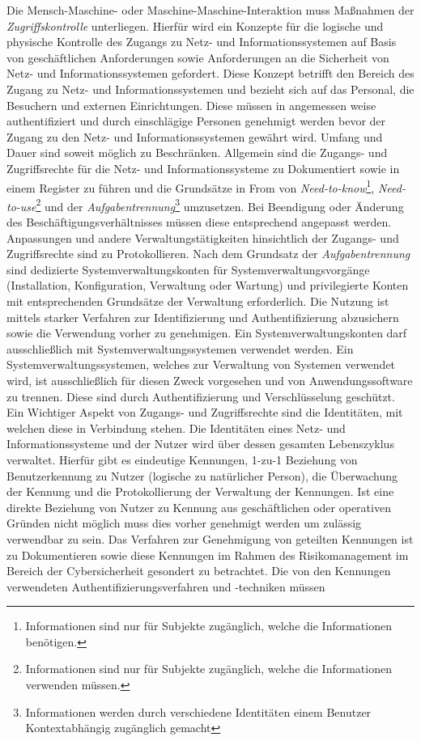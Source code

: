 \documentclass[11pt,a4paper,hidelinks]{article}   %
\begin{document}
                Die Mensch-Maschine- oder Maschine-Maschine-Interaktion muss Maßnahmen der \emph{Zugriffskontrolle} unterliegen. Hierfür wird ein Konzepte für die logische und physische Kontrolle des Zugangs zu Netz- und Informationssystemen auf Basis von geschäftlichen Anforderungen sowie Anforderungen an die Sicherheit von Netz- und Informationssystemen gefordert. Diese Konzept betrifft den Bereich des Zugang zu Netz- und Informationssystemen und bezieht sich auf das Personal, die Besuchern und externen Einrichtungen. Diese müssen in angemessen weise authentifiziert und durch einschlägige Personen genehmigt werden bevor der Zugang zu den Netz- und Informationssystemen gewährt wird. Umfang und Dauer sind soweit möglich zu Beschränken. Allgemein sind die Zugangs- und Zugriffsrechte für die Netz- und Informationssysteme zu Dokumentiert sowie in einem Register zu führen und die Grundsätze in From von \emph{Need-to-know}\footnote{Informationen sind nur für Subjekte zugänglich, welche die Informationen benötigen.}, \emph{Need-to-use}\footnote{Informationen sind nur für Subjekte zugänglich, welche die Informationen verwenden müssen.} und der \emph{Aufgabentrennung}\footnote{Informationen werden durch verschiedene Identitäten einem Benutzer Kontextabhängig zugänglich gemacht} umzusetzen. Bei Beendigung oder Änderung des Beschäftigungsverhältnisses müssen diese entsprechend angepasst werden. Anpassungen und andere Verwaltungstätigkeiten hinsichtlich der Zugangs- und Zugriffsrechte sind zu Protokollieren. Nach dem Grundsatz der \emph{Aufgabentrennung} sind dedizierte Systemverwaltungskonten für Systemverwaltungsvorgänge (Installation, Konfiguration, Verwaltung oder Wartung) und privilegierte Konten mit entsprechenden Grundsätze der Verwaltung erforderlich. Die Nutzung ist mittels starker Verfahren zur Identifizierung und Authentifizierung abzusichern sowie die Verwendung vorher zu genehmigen. Ein Systemverwaltungskonten darf ausschließlich mit Systemverwaltungssystemen verwendet werden. Ein Systemverwaltungssystemen, welches zur Verwaltung von Systemen verwendet wird, ist ausschließlich für diesen Zweck vorgesehen und von Anwendungssoftware zu trennen. Diese sind durch Authentifizierung und Verschlüsselung geschützt. Ein Wichtiger Aspekt von Zugangs- und Zugriffsrechte sind die Identitäten, mit welchen diese in Verbindung stehen. Die Identitäten eines Netz- und Informationssysteme und der Nutzer wird über dessen gesamten Lebenszyklus verwaltet. Hierfür gibt es eindeutige Kennungen, 1-zu-1 Beziehung von Benutzerkennung zu Nutzer (logische zu natürlicher Person), die Überwachung der Kennung und die Protokollierung der Verwaltung der Kennungen. Ist eine direkte Beziehung von Nutzer zu Kennung aus geschäftlichen oder operativen Gründen nicht möglich muss dies vorher genehmigt werden um zulässig verwendbar zu sein. Das Verfahren zur Genehmigung von geteilten Kennungen ist zu Dokumentieren sowie diese Kennungen im Rahmen des Risikomanagement im Bereich der Cybersicherheit gesondert zu betrachtet. Die von den Kennungen verwendeten Authentifizierungsverfahren und -techniken müssen 
\end{document}
